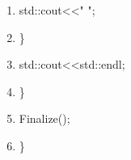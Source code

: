 \documentclass{article}
\begin{document}
\begin{shadebox}
\begin{enumerate}
\item \hspace{10pt} \hspace{10pt}         std::cout\textless \textless "    ";
\item \hspace{10pt}         \}
\item \hspace{10pt}         std::cout\textless \textless std::endl;
\item \}
\item Finalize();
\item \}
\end{enumerate}
\end{shadebox}
\end{document}
